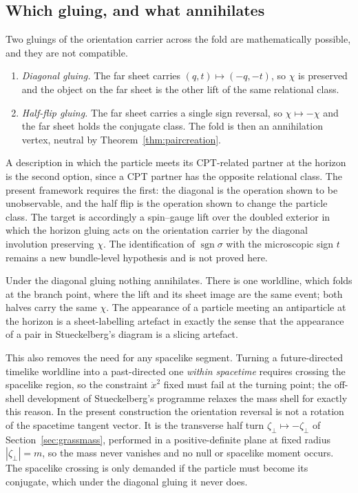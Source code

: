 \documentclass[11pt]{article}
\newcommand{\sgn}{\operatorname{sgn}}
\theoremstyle{definition}\newtheorem{definition}[theorem]{Definition}
\theoremstyle{remark}\newtheorem{remark}[theorem]{Remark}\newtheorem{conjecture}[theorem]{Conjecture}
\begin{document}
\subsection{Which gluing, and what annihilates}\label{subsec:mirrorgluing}
Two gluings of the orientation carrier across the fold are mathematically possible, and they are not compatible.
\begin{enumerate}[leftmargin=2.2em]
\item \emph{Diagonal gluing.} The far sheet carries $(q,t)\mapsto(-q,-t)$, so $\chi$ is preserved and the object on the far sheet is the other lift of the same relational class.
\item \emph{Half-flip gluing.} The far sheet carries a single sign reversal, so $\chi\mapsto-\chi$ and the far sheet holds the conjugate class. The fold is then an annihilation vertex, neutral by Theorem~\ref{thm:paircreation}.
\end{enumerate}
A description in which the particle meets its CPT-related partner at the horizon is the second option, since a CPT partner has the opposite relational class. The present framework requires the first: the diagonal is the operation shown to be unobservable, and the half flip is the operation shown to change the particle class. The target is accordingly a spin--gauge lift over the doubled exterior in which the horizon gluing acts on the orientation carrier by the diagonal involution preserving $\chi$. The identification of $\sgn\sigma$ with the microscopic sign $t$ remains a new bundle-level hypothesis and is not proved here.

Under the diagonal gluing nothing annihilates. There is one worldline, which folds at the branch point, where the lift and its sheet image are the same event; both halves carry the same $\chi$. The appearance of a particle meeting an antiparticle at the horizon is a sheet-labelling artefact in exactly the sense that the appearance of a pair in Stueckelberg's diagram is a slicing artefact.

This also removes the need for any spacelike segment. Turning a future-directed timelike worldline into a past-directed one \emph{within spacetime} requires crossing the spacelike region, so the constraint $\dot x^2$ fixed must fail at the turning point; the off-shell development of Stueckelberg's programme relaxes the mass shell for exactly this reason. In the present construction the orientation reversal is not a rotation of the spacetime tangent vector. It is the transverse half turn $\zeta_\perp\mapsto-\zeta_\perp$ of Section~\ref{sec:grassmass}, performed in a positive-definite plane at fixed radius $|\zeta_\perp|=m$, so the mass never vanishes and no null or spacelike moment occurs. The spacelike crossing is only demanded if the particle must become its conjugate, which under the diagonal gluing it never does.
\end{document}
